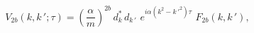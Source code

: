 \begin{equation}\label{e^Q(tau)1}
V_{2b}(k,k\,';\tau)=\left(\frac{\alpha}{m}\right)^{2b}\,d_k^*\,d_{k\,'}
\,\,e^{i\alpha(k^2-k\,'^2)\tau}\,\,F_{2b}(k,k\,'),
\end{equation}

